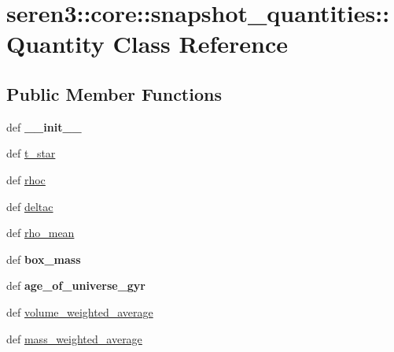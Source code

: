 \hypertarget{classseren3_1_1core_1_1snapshot__quantities_1_1Quantity}{
\section{seren3::core::snapshot\_\-quantities::Quantity Class Reference}
\label{classseren3_1_1core_1_1snapshot__quantities_1_1Quantity}
}
\subsection*{Public Member Functions}
\begin{DoxyCompactItemize}
\item 
\hypertarget{classseren3_1_1core_1_1snapshot__quantities_1_1Quantity_a151d8c6e28adbf32be5c74875eea5add}{
def {\bfseries \_\-\_\-init\_\-\_\-}}
\label{classseren3_1_1core_1_1snapshot__quantities_1_1Quantity_a151d8c6e28adbf32be5c74875eea5add}

\item 
def \hyperlink{classseren3_1_1core_1_1snapshot__quantities_1_1Quantity_a4c619864800c24af98334167387ea2f6}{t\_\-star}
\item 
def \hyperlink{classseren3_1_1core_1_1snapshot__quantities_1_1Quantity_a5907e12dfe17e75ca69e0b08f8c7ef5d}{rhoc}
\item 
def \hyperlink{classseren3_1_1core_1_1snapshot__quantities_1_1Quantity_a7409d7e76fb3f406e9bd813e2d8e32c4}{deltac}
\item 
def \hyperlink{classseren3_1_1core_1_1snapshot__quantities_1_1Quantity_ac4c8c6f7ba1b4d0e9c5edb5563068a6c}{rho\_\-mean}
\item 
\hypertarget{classseren3_1_1core_1_1snapshot__quantities_1_1Quantity_abebbac122e0ee63c672d9c3554c91496}{
def {\bfseries box\_\-mass}}
\label{classseren3_1_1core_1_1snapshot__quantities_1_1Quantity_abebbac122e0ee63c672d9c3554c91496}

\item 
\hypertarget{classseren3_1_1core_1_1snapshot__quantities_1_1Quantity_a3ef0289b3dd4be9c0f253713bba2a4ca}{
def {\bfseries age\_\-of\_\-universe\_\-gyr}}
\label{classseren3_1_1core_1_1snapshot__quantities_1_1Quantity_a3ef0289b3dd4be9c0f253713bba2a4ca}

\item 
def \hyperlink{classseren3_1_1core_1_1snapshot__quantities_1_1Quantity_a3295c3ce11ea5f4e16163849820c6223}{volume\_\-weighted\_\-average}
\item 
def \hyperlink{classseren3_1_1core_1_1snapshot__quantities_1_1Quantity_ac08785368045c8a4bac3acef49be02ee}{mass\_\-weighted\_\-average}
\end{DoxyCompactItemize}
